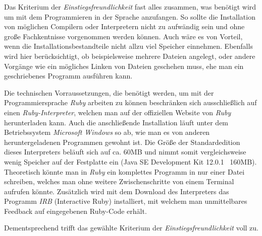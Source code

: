 \documentclass[12pt,DIV=14, version=first, BCOR=10mm,a4paper,twoside,parskip=half-,headsepline,headinclude]{scrartcl}
\begin{document}
\begin{flushleft}
Das Kriterium der \textit{Einstiegsfreundlichkeit} fast alles zusammen, was benötigt wird um mit dem Programmieren in der Sprache anzufangen. So sollte die Installation von möglichen Compilern oder Interpretern nicht zu aufwändig sein und ohne große Fachkentnisse vorgenommen werden können. Auch wäre es von Vorteil, wenn die Installationsbestandteile nicht allzu viel Speicher einnehmen. Ebenfalls wird hier berücksichtigt, ob beispielsweise mehrere Dateien angelegt, oder andere Vorgänge wie ein mögliches Linken von Dateien geschehen muss, ehe man ein geschriebenes Programm ausführen kann.

Die technischen Vorraussetzungen, die benötigt werden, um mit der Programmiersprache \textit{\glqq Ruby\grqq} arbeiten zu können beschränken sich ausschließlich auf einen \textit{Ruby-Interpreter}, welchen man auf der offiziellen Website von \textit{\glqq Ruby\grqq} herunterladen kann. Auch die anschließende Installation läuft unter dem Betriebssystem \textit{Microsoft Windows} so ab, wie man es von anderen heruntergeladenen Programmen gewohnt ist. Die Größe der Standardedition dieses Interpreters beläuft sich auf ca. 60MB und nimmt somit vergleichsweise wenig Speicher auf der Festplatte ein (Java SE Development Kit 12.0.1 ~160MB).
Theoretisch könnte man in \textit{\glqq Ruby\grqq} ein komplettes Programm in nur einer Datei schreiben, welches man ohne weitere Zwischenschritte von einem Terminal aufrufen könnte. Zusätzlich wird mit dem Download des Interpreters das Programm \textit{IRB} (Interactive Ruby) installiert, mit welchem man unmittelbares Feedback auf eingegebenen Ruby-Code erhält.

Dementsprechend trifft das gewählte Kriterium der \textit{Einstiegsfreundlichkeit} voll zu.
\end{flushleft}
\end{document}
